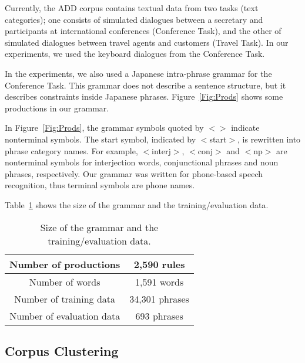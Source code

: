 Currently, the ADD corpus contains textual data from two tasks (text categories);
one consists of simulated dialogues between a secretary and participants
at international conferences (Conference Task),
and the other of simulated dialogues between travel agents and customers (Travel Task).
In our experiments,
we used the keyboard dialogues from the Conference Task.

In the experiments,
we also used a Japanese intra-phrase grammar
for the Conference Task.
This grammar does not describe a sentence structure,
but it describes constraints inside Japanese phrases.
Figure~\ref{Fig:Prods}
shows some productions in our grammar.


In Figure~\ref{Fig:Prods},
the grammar symbols quoted by\hspace*{1mm} $<>$ \hspace*{1mm}indicate \hspace*{1mm}nonterminal \hspace*{1mm}symbols.\hspace*{1mm}
The start symbol, indicated by $<$start$>$,
is rewritten into phrase category names.
For example, $<$interj$>$, $<$conj$>$ and $<$np$>$
are nonterminal symbols for
interjection words, conjunctional phrases and noun phrases,
respectively.
Our grammar was written for phone-based speech recognition,
thus terminal symbols are phone names.

Table~\ref{Tab:CFG}
shows the size of the grammar
and the training/evaluation data.



\begin{table}[h]
\caption{Size of the grammar and the training/evaluation data.} \label{Tab:CFG}
\begin{center}
\begin{tabular}{c|c}
\hline
Number of productions	&  2,590 rules	\\ \hline
Number of words		&  1,591 words	\\ \hline
Number of training data	&  34,301 phrases	\\ \hline
Number of evaluation data & 693 phrases		\\ \hline
\end{tabular}
\end{center}
\end{table}


\subsection{Corpus Clustering}

